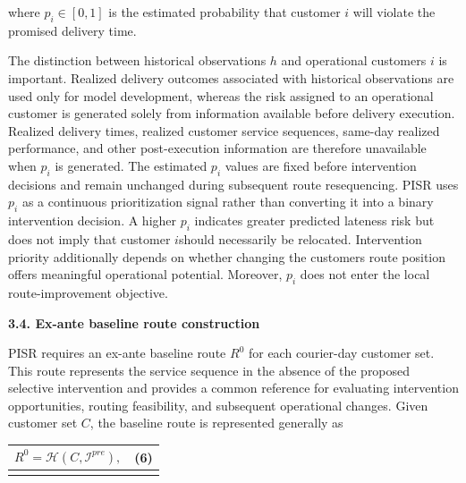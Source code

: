 \documentclass[
]{article}
\newcounter{none} %
\begin{document}
where \(p_{i} \in \left\lbrack 0,1 \right\rbrack\) is the estimated
probability that customer \(i\) will violate the promised delivery time.

The distinction between historical observations \(h\) and operational
customers \(i\) is important. Realized delivery outcomes associated with
historical observations are used only for model development, whereas the
risk assigned to an operational customer is generated solely from
information available before delivery execution. Realized delivery
times, realized customer service sequences, same-day realized
performance, and other post-execution information are therefore
unavailable when \(p_{i}\) is generated. The estimated \(p_{i}\) values
are fixed before intervention decisions and remain unchanged during
subsequent route resequencing. PISR uses \(p_{i}\) as a continuous
prioritization signal rather than converting it into a binary
intervention decision. A higher \(p_{i}\) indicates greater predicted
lateness risk but does not imply that customer \(i\)should necessarily
be relocated. Intervention priority additionally depends on whether
changing the customer\textquotesingle s route position offers meaningful
operational potential. Moreover, \(p_{i}\) does not enter the local
route-improvement objective.

\textbf{3.4. Ex-ante baseline route construction}

PISR requires an ex-ante baseline route \(R^{0}\) for each courier-day
customer set. This route represents the service sequence in the absence
of the proposed selective intervention and provides a common reference
for evaluating intervention opportunities, routing feasibility, and
subsequent operational changes. Given customer set \(C\), the baseline
route is represented generally as

{\def\LTcaptype{none} %
\begin{longtable}[]{@{}
  >{\raggedright\arraybackslash}p{}
  >{\raggedright\arraybackslash}p{}@{}}
\toprule\noalign{}
\begin{minipage}[b]{\linewidth}\raggedright
\[R^{0}\mathcal{= H}\left( C,\mathcal{I}^{pre} \right),\]
\end{minipage} & \begin{minipage}[b]{\linewidth}\raggedleft
(6)
\end{minipage} \\
\midrule\noalign{}
\endhead
\bottomrule\noalign{}
\endlastfoot
\end{longtable}
}
\end{document}

